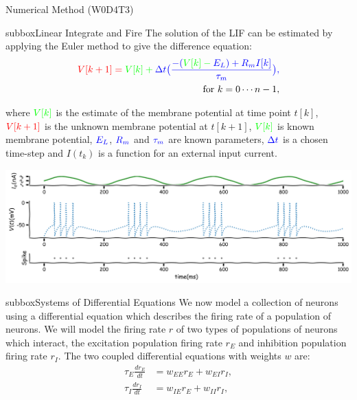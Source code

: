 \begin{textbox}{Numerical Method (W0D4T3)}
\begin{subbox}{subbox}{Linear Integrate and Fire }
\scriptsize
The solution of the LIF can be estimated by applying the Euler method to give the difference equation:
\begin{align*}
\color{red}{V[k+1]}=\color{green}{V[k]}+\color{blue}{\Delta t}\big(\frac{-(\color{green}{V[k]}-\color{blue}{E_L}) + \color{blue}{R_m}I[k]}{\color{blue}{\tau_m}}\big),\\
\text{for } k=0\cdots n-1,
\end{align*}

where $\color{green}{V[k]}$ is the estimate of the membrane potential at time point $t[k]$,
 $\color{red}{V[k+1]}$ is the unknown membrane potential at $t[k+1]$, $\color{green}{V[k]} $ is known membrane potential, $\color{blue}{E_L}$, $\color{blue}{R_m}$ and $\color{blue}{\tau_m}$ are known parameters, $\color{blue}{\Delta t}$ is a chosen time-step and  $I(t_k)$ is a function for an external input current.
 
\centering
\includegraphics[scale=0.1]{Figures/PreCourse/CFigure8.png}
\end{subbox}

\begin{subbox}{subbox}{Systems of Differential Equations}
\scriptsize
We now model a collection of neurons using a differential equation which describes the firing rate of a population of neurons. 
We will model the firing rate $r$ of two types of populations of neurons which interact, the excitation population firing rate $r_E$ and inhibition population firing rate $r_I$.
 The two coupled differential equations with weights $w$ are:
\begin{align}
\tau_E \frac{dr_E}{dt} &=w_{EE}r_E +w_{EI}r_I, \\
\tau_I \frac{dr_I}{dt} &=w_{IE}r_E +w_{II}r_I ,
\end{align}


\end{subbox}
\end{textbox}
